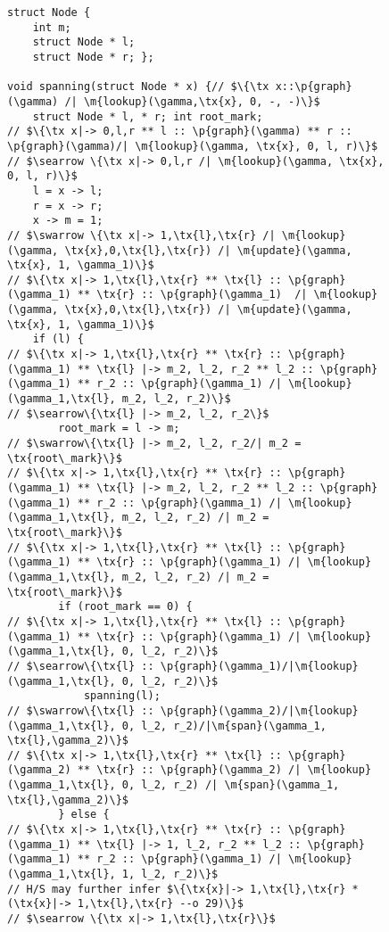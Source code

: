 \documentclass{article}
\newcommand{\tx}[1]{\text{#1}}
\newcommand{\p}[1]{\ensuremath{\mathsf{#1}}} %
\newcommand{\m}[1]{\ensuremath{\mathit{#1}}} %
\begin{document}
\begin{figure}[t]
\begin{lstlisting}
struct Node {
    int m;
    struct Node * l;
    struct Node * r; };

void spanning(struct Node * x) {// $\{\tx x::\p{graph}(\gamma) /| \m{lookup}(\gamma,\tx{x}, 0, -, -)\}$
    struct Node * l, * r; int root_mark;
// $\{\tx x|-> 0,l,r ** l :: \p{graph}(\gamma) ** r :: \p{graph}(\gamma)/| \m{lookup}(\gamma, \tx{x}, 0, l, r)\}$
// $\searrow \{\tx x|-> 0,l,r /| \m{lookup}(\gamma, \tx{x}, 0, l, r)\}$
    l = x -> l;
    r = x -> r;
    x -> m = 1;
// $\swarrow \{\tx x|-> 1,\tx{l},\tx{r} /| \m{lookup}(\gamma, \tx{x},0,\tx{l},\tx{r}) /| \m{update}(\gamma, \tx{x}, 1, \gamma_1)\}$
// $\{\tx x|-> 1,\tx{l},\tx{r} ** \tx{l} :: \p{graph}(\gamma_1) ** \tx{r} :: \p{graph}(\gamma_1)  /| \m{lookup}(\gamma, \tx{x},0,\tx{l},\tx{r}) /| \m{update}(\gamma, \tx{x}, 1, \gamma_1)\}$
    if (l) {
// $\{\tx x|-> 1,\tx{l},\tx{r} ** \tx{r} :: \p{graph}(\gamma_1) ** \tx{l} |-> m_2, l_2, r_2 ** l_2 :: \p{graph}(\gamma_1) ** r_2 :: \p{graph}(\gamma_1) /| \m{lookup}(\gamma_1,\tx{l}, m_2, l_2, r_2)\}$
// $\searrow\{\tx{l} |-> m_2, l_2, r_2\}$
        root_mark = l -> m;
// $\swarrow\{\tx{l} |-> m_2, l_2, r_2/| m_2 = \tx{root\_mark}\}$
// $\{\tx x|-> 1,\tx{l},\tx{r} ** \tx{r} :: \p{graph}(\gamma_1) ** \tx{l} |-> m_2, l_2, r_2 ** l_2 :: \p{graph}(\gamma_1) ** r_2 :: \p{graph}(\gamma_1) /| \m{lookup}(\gamma_1,\tx{l}, m_2, l_2, r_2) /| m_2 = \tx{root\_mark}\}$
// $\{\tx x|-> 1,\tx{l},\tx{r} ** \tx{l} :: \p{graph}(\gamma_1) ** \tx{r} :: \p{graph}(\gamma_1) /| \m{lookup}(\gamma_1,\tx{l}, m_2, l_2, r_2) /| m_2 = \tx{root\_mark}\}$
        if (root_mark == 0) {
// $\{\tx x|-> 1,\tx{l},\tx{r} ** \tx{l} :: \p{graph}(\gamma_1) ** \tx{r} :: \p{graph}(\gamma_1) /| \m{lookup}(\gamma_1,\tx{l}, 0, l_2, r_2)\}$
// $\searrow\{\tx{l} :: \p{graph}(\gamma_1)/|\m{lookup}(\gamma_1,\tx{l}, 0, l_2, r_2)\}$
            spanning(l);
// $\swarrow\{\tx{l} :: \p{graph}(\gamma_2)/|\m{lookup}(\gamma_1,\tx{l}, 0, l_2, r_2)/|\m{span}(\gamma_1, \tx{l},\gamma_2)\}$
// $\{\tx x|-> 1,\tx{l},\tx{r} ** \tx{l} :: \p{graph}(\gamma_2) ** \tx{r} :: \p{graph}(\gamma_2) /| \m{lookup}(\gamma_1,\tx{l}, 0, l_2, r_2) /| \m{span}(\gamma_1, \tx{l},\gamma_2)\}$
        } else {
// $\{\tx x|-> 1,\tx{l},\tx{r} ** \tx{r} :: \p{graph}(\gamma_1) ** \tx{l} |-> 1, l_2, r_2 ** l_2 :: \p{graph}(\gamma_1) ** r_2 :: \p{graph}(\gamma_1) /| \m{lookup}(\gamma_1,\tx{l}, 1, l_2, r_2)\}$
// H/S may further infer $\{\tx{x}|-> 1,\tx{l},\tx{r} * (\tx{x}|-> 1,\tx{l},\tx{r} --o 29)\}$
// $\searrow \{\tx x|-> 1,\tx{l},\tx{r}\}$

\end{lstlisting}
\end{figure}
\end{document}
